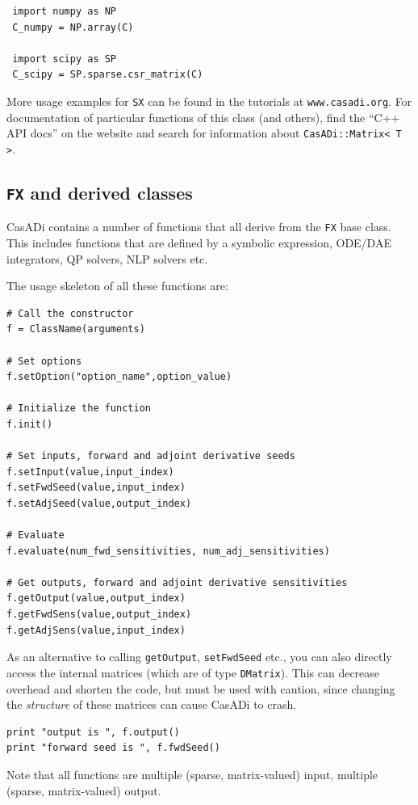 \documentclass[a4paper,12pt]{book}
\begin{document}
{\begin{verbatim}
 import numpy as NP
 C_numpy = NP.array(C)

 import scipy as SP
 C_scipy = SP.sparse.csr_matrix(C)
\end{verbatim}

More usage examples for \texttt{SX} can be found in the tutorials at \texttt{www.casadi.org}. For documentation of particular functions of this class (and others), find the ``C++ API docs'' on the website and search for information about \texttt{CasADi::Matrix<\,T\,>}.

\subsection{\texttt{FX} and derived classes}
CasADi contains a number of functions that all derive from the \texttt{FX} base class. This includes functions that are defined by a symbolic expression, ODE/DAE integrators, QP solvers, NLP solvers etc.

The usage skeleton of all these functions are:
\begin{verbatim}
# Call the constructor
f = ClassName(arguments)

# Set options
f.setOption("option_name",option_value)

# Initialize the function
f.init()

# Set inputs, forward and adjoint derivative seeds
f.setInput(value,input_index)
f.setFwdSeed(value,input_index)
f.setAdjSeed(value,output_index)

# Evaluate
f.evaluate(num_fwd_sensitivities, num_adj_sensitivities)

# Get outputs, forward and adjoint derivative sensitivities
f.getOutput(value,output_index)
f.getFwdSens(value,output_index)
f.getAdjSens(value,input_index)
\end{verbatim}

As an alternative to calling \texttt{getOutput}, \texttt{setFwdSeed} etc., you can also directly access the internal matrices (which are of type \texttt{DMatrix}). This can decrease overhead and shorten the code, but must be used with caution, since changing the \emph{structure} of these matrices can cause CasADi to crash.
\begin{verbatim}
print "output is ", f.output()
print "forward seed is ", f.fwdSeed()
\end{verbatim}

Note that all functions are multiple (sparse, matrix-valued) input, multiple (sparse, matrix-valued) output.

}
\end{document}
